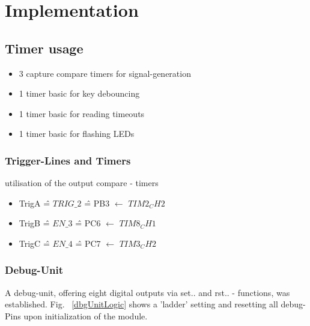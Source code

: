 	\chapter{Implementation}
	\label{cha:Implementation}
		\section{Timer usage}
			\begin{itemize} \setlength\itemsep{1px}
			\item 3 capture compare timers for signal-generation
			\item 1 timer basic for key debouncing 
			\item 1 timer basic for reading timeouts
			\item 1 timer basic for flashing LEDs
			\end{itemize}
		\subsection{Trigger-Lines and Timers}
		utilisation of the output compare - timers
		\begin{itemize}
			\item TrigA \^{=} $TRIG\_2$  \^{=} PB3 $\leftarrow$ $TIM2_CH2$
			\item TrigB \^{=} $EN\_3$    \^{=} PC6 $\leftarrow$ $TIM8_CH1$
			\item TrigC \^{=} $EN\_4$    \^{=} PC7 $\leftarrow$ $TIM3_CH2$
		\end{itemize}
		\subsection{Debug-Unit}
		A debug-unit, offering eight digital outputs via set.. and rst.. - functions, was established. Fig. ~\ref{dbgUnitLogic} shows a 'ladder' setting and resetting all debug-Pins upon initialization of the module. 
		
